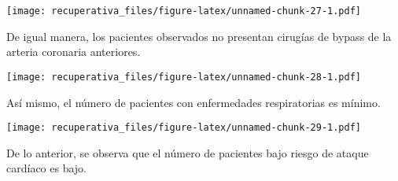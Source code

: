 \documentclass[
  spanish,
]{article}
\newenvironment{Shaded}{\begin{snugshade}}{\end{snugshade}}
\newcommand{\DataTypeTok}[1]{\textcolor[rgb]{0.13,0.29,0.53}{#1}}
\newcommand{\KeywordTok}[1]{\textcolor[rgb]{0.13,0.29,0.53}{\textbf{#1}}}
\newcommand{\NormalTok}[1]{#1}
\newcommand{\OperatorTok}[1]{\textcolor[rgb]{0.81,0.36,0.00}{\textbf{#1}}}
\newcommand{\StringTok}[1]{\textcolor[rgb]{0.31,0.60,0.02}{#1}}
\begin{document}
\texttt{[image: recuperativa\_files/figure-latex/unnamed-chunk-27-1.pdf]}

De igual manera, los pacientes observados no presentan cirugías de
bypass de la arteria coronaria anteriores.

\begin{Shaded}
\end{Shaded}

\texttt{[image: recuperativa\_files/figure-latex/unnamed-chunk-28-1.pdf]}

Así mismo, el número de pacientes con enfermedades respiratorias es
mínimo.

\begin{Shaded}
\end{Shaded}

\texttt{[image: recuperativa\_files/figure-latex/unnamed-chunk-29-1.pdf]}

De lo anterior, se observa que el número de pacientes bajo riesgo de
ataque cardíaco es bajo.
\end{document}
